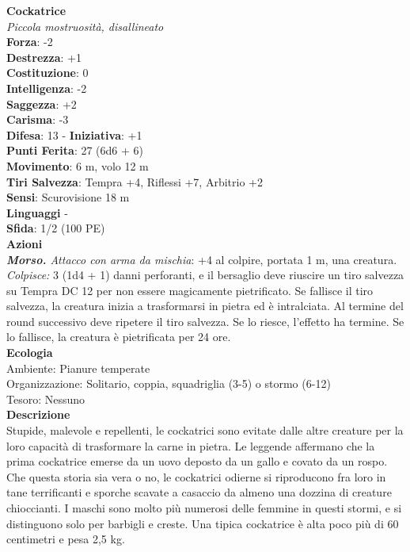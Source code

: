 \begin{multicols}{2}
\medskip\textbf{Cockatrice}\\
\emph{Piccola mostruosità, disallineato}\\
\textbf{Forza}: -2\\
\textbf{Destrezza}: +1\\
\textbf{Costituzione}: 0\\
\textbf{Intelligenza}: -2\\
\textbf{Saggezza}: +2\\
\textbf{Carisma}: -3\\
\textbf{Difesa}: 13 - \textbf{Iniziativa}: +1\\
\textbf{Punti Ferita}: 27 (6d6 + 6)\\
\textbf{Movimento}: 6 m, volo 12 m\\
\textbf{Tiri Salvezza}: Tempra +4, Riflessi +7, Arbitrio +2\\
\textbf{Sensi}: Scurovisione 18 m\\
\textbf{Linguaggi} -\\
\textbf{Sfida}: 1/2 (100 PE)\smallskip\\
\smallskip\textbf{Azioni}\\
\emph{\textbf{Morso.} Attacco con arma da mischia}: +4 al colpire, portata 1 m, una creatura.\\
\emph{Colpisce:} 3 (1d4 + 1) danni perforanti, e il bersaglio deve riuscire un tiro salvezza su Tempra DC  12 per non essere magicamente pietrificato. Se fallisce il tiro salvezza, la creatura inizia a trasformarsi in pietra ed è intralciata. Al termine del round successivo deve ripetere il tiro salvezza. Se lo riesce, l'effetto ha termine. Se lo fallisce, la creatura è pietrificata per 24 ore.\\
\textbf{Ecologia}\\
Ambiente: Pianure temperate\\
Organizzazione: Solitario, coppia, squadriglia (3-5) o stormo (6-12)\\
Tesoro: Nessuno\\
\textbf{Descrizione}\\
Stupide, malevole e repellenti, le cockatrici sono evitate dalle altre creature per la loro capacità di trasformare la carne in pietra. Le leggende affermano che la prima cockatrice emerse da un uovo deposto da un gallo e covato da un rospo. Che questa storia sia vera o no, le cockatrici odierne si riproducono fra loro in tane terrificanti e sporche scavate a casaccio da almeno una dozzina di creature chioccianti. I maschi sono molto più numerosi delle femmine in questi stormi, e si distinguono solo per barbigli e creste. Una tipica cockatrice è alta poco più di 60 centimetri e pesa 2,5 kg.\\

\end{multicols}
